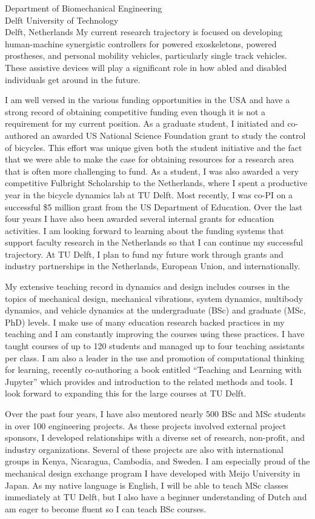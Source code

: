 \documentclass{letter}
\begin{document}
\begin{letter}{
  Department of Biomechanical Engineering \\
  Delft University of Technology \\
  Delft, Netherlands
}
My current research trajectory is focused on developing human-machine
synergistic controllers for powered exoskeletons, powered prostheses, and
personal mobility vehicles, particularly single track vehicles. These assistive
devices will play a significant role in how abled and disabled individuals get
around in the future.

I am well versed in the various funding opportunities in the USA and have a
strong record of obtaining competitive funding even though it is not a
requirement for my current position. As a graduate student, I initiated and
co-authored an awarded US National Science Foundation grant to study the
control of bicycles. This effort was unique given both the student initiative
and the fact that we were able to make the case for obtaining resources for a
research area that is often more challenging to fund. As a student, I was also
awarded a very competitive Fulbright Scholarship to the Netherlands, where I
spent a productive year in the bicycle dynamics lab at TU Delft. Most recently,
I was co-PI on a successful \$5 million grant from the US Department of
Education. Over the last four years I have also been awarded several internal
grants for education activities. I am looking forward to learning about the
funding systems that support faculty research in the Netherlands so that I can
continue my successful trajectory. At TU Delft, I plan to fund my future work
through grants and industry partnerships in the Netherlands, European Union,
and internationally.

My extensive teaching record in dynamics and design includes courses in the
topics of mechanical design, mechanical vibrations, system dynamics, multibody
dynamics, and vehicle dynamics at the undergraduate (BSc) and graduate (MSc,
PhD) levels. I make use of many education research backed practices in my
teaching and I am constantly improving the courses using these practices. I
have taught courses of up to 120 students and managed up to four teaching
assistants per class. I am also a leader in the use and promotion of
computational thinking for learning, recently co-authoring a book entitled
``Teaching and Learning with Jupyter'' which provides and introduction to the
related methods and tools. I look forward to expanding this for the large
courses at TU Delft.

Over the past four years, I have also mentored nearly 500 BSc and MSc students
in over 100 engineering projects. As these projects involved external project
sponsors, I developed relationships with a diverse set of research, non-profit,
and industry organizations. Several of these projects are also with
international groups in Kenya, Nicaragua, Cambodia, and Sweden. I am especially
proud of the mechanical design exchange program I have developed with Meijo
University in Japan. As my native language is English, I will be able to teach
MSc classes immediately at TU Delft, but I also have a beginner understanding
of Dutch and am eager to become fluent so I can teach BSc courses.


\end{letter}
\end{document}
